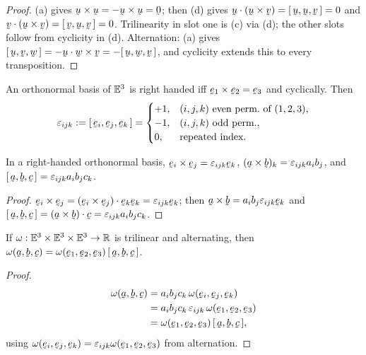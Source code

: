 \begin{proof}
(a) gives $\bu\times\bu=-\bu\times\bu=\bze$; then (d) gives
$\ip\bu{(\bu\times\bv)}=\tbox\bu\bu\bv=0$ and
$\ip\bv{(\bu\times\bv)}=\tbox\bv\bu\bv=0$. Trilinearity in slot one is (c)
via (d); the other slots follow from cyclicity in (d). Alternation: (a)
gives $\tbox\bu\bv\bw=-\ip\bu{\bw\times\bv}=-\tbox\bu\bw\bv$, and cyclicity
extends this to every transposition.
\end{proof}

\begin{definition}\label{def:perm}
An orthonormal basis of $\mathbb{E}^{3}$ is right handed iff
$\be_{1}\times\be_{2}=\be_{3}$ and cyclically. Then
\[
\eps_{ijk}:=\tbox{\be_{i}}{\be_{j}}{\be_{k}}=
\begin{cases}+1,&(i,j,k)\ \text{even perm.\ of}\ (1,2,3),\\
-1,&(i,j,k)\ \text{odd perm.},\\ 0,&\text{repeated index.}\end{cases}
\]
\end{definition}

\begin{proposition}\label{prop:crosscomp}
In a right-handed orthonormal basis,
$\be_{i}\times\be_{j}=\eps_{ijk}\be_{k}$,
$(\ba\times\bb)_{k}=\eps_{ijk}a_{i}b_{j}$, and
$\tbox\ba\bb\bc=\eps_{ijk}a_{i}b_{j}c_{k}$.
\end{proposition}

\begin{proof}
$\be_{i}\times\be_{j}=\ip{(\be_{i}\times\be_{j})}{\be_{k}}\be_{k}
=\eps_{ijk}\be_{k}$; then
$\ba\times\bb=a_{i}b_{j}\eps_{ijk}\be_{k}$ and
$\tbox\ba\bb\bc=\ip{(\ba\times\bb)}\bc=\eps_{ijk}a_{i}b_{j}c_{k}$.
\end{proof}

\begin{lemma}\label{lem:altform}
If $\omega:\mathbb{E}^{3}\times\mathbb{E}^{3}\times\mathbb{E}^{3}\to\mathbb{R}$ is trilinear and alternating, then
$\omega(\ba,\bb,\bc)=\omega(\be_{1},\be_{2},\be_{3})\,\tbox\ba\bb\bc$.
\end{lemma}

\begin{proof}
\[
\begin{aligned}
\omega(\ba,\bb,\bc)&=a_{i}b_{j}c_{k}\,\omega(\be_{i},\be_{j},\be_{k})\\
&=a_{i}b_{j}c_{k}\,\eps_{ijk}\,\omega(\be_{1},\be_{2},\be_{3})\\
&=\omega(\be_{1},\be_{2},\be_{3})\,\tbox\ba\bb\bc,
\end{aligned}
\]
using
$\omega(\be_{i},\be_{j},\be_{k})=\eps_{ijk}\omega(\be_1,\be_2,\be_3)$ from
alternation.
\end{proof}


